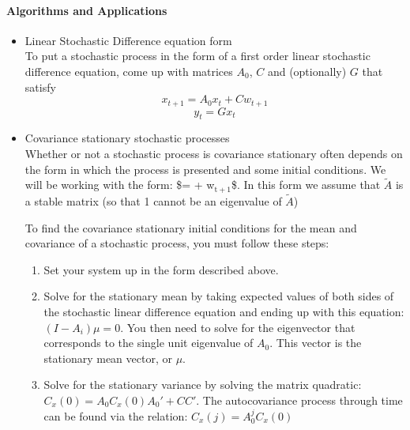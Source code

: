 \documentclass[11pt]{article}
\begin{document}
\paragraph{Algorithms and Applications}
\label{sec-1-1-3-2}
\begin{itemize}

\item Linear Stochastic Difference equation form\\
\label{sec-1-1-3-2-1}%
To put a stochastic process in the form of a first order linear
stochastic difference equation, come up with matrices $A_0$, $C$ and
(optionally) $G$ that satisfy $$x_{t+1} = A_0 x_t + C w_{t+1}$$ $$ y_t
= G x_t$$


\item Covariance stationary stochastic processes\\
\label{sec-1-1-3-2-2}%
Whether or not a stochastic process is covariance stationary often
 depends on the form in which the process is presented and some
 initial conditions. We will be working with the form:
 \$ = \left[\begin{smallmatrix} 1 \& 0 \\ 0 \&
 \~{}{A\} \end{smallmatrix}\right]  +  w$_{\mathrm{t+1}}$\$. In this form we
 assume that $\tilde{A}$ is a stable matrix (so that 1 cannot be an
 eigenvalue of $\tilde{A}$)

To find the covariance stationary initial conditions for the mean and
covariance of a stochastic process, you must follow these steps:

\begin{enumerate}
\item Set your system up in the form described above.
\item Solve for the stationary mean by taking expected values of both
   sides of the stochastic linear difference equation and ending up
   with this equation: $(I - A_i) \mu = 0$. You then need to solve for
   the eigenvector that corresponds to the single unit eigenvalue of
   $A_0$. This vector is the stationary mean vector, or $\mu$.
\item Solve for the stationary variance by solving the matrix quadratic:
   $C_x(0) = A_0 C_x(0)A_0' + CC'$. The autocovariance process through
   time can be found via the relation: $C_x(j) = A_0^j C_x(0)$
\end{enumerate}



\end{itemize}
\end{document}
